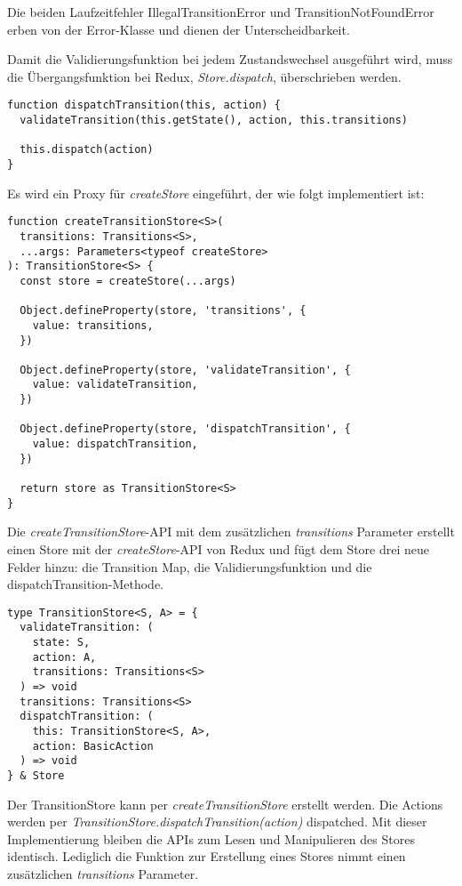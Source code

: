 Die beiden Laufzeitfehler IllegalTransitionError und TransitionNotFoundError erben von der Error-Klasse und dienen der Unterscheidbarkeit.

Damit die Validierungsfunktion bei jedem Zustandswechsel ausgeführt wird, muss die Übergangsfunktion bei Redux, \textit{Store.dispatch}, überschrieben werden.

\begin{lstlisting}
function dispatchTransition(this, action) {
  validateTransition(this.getState(), action, this.transitions)
  
  this.dispatch(action)
}
\end{lstlisting}

Es wird ein Proxy für \textit{createStore} eingeführt, der wie folgt implementiert ist:

\begin{lstlisting}
function createTransitionStore<S>(
  transitions: Transitions<S>,
  ...args: Parameters<typeof createStore>
): TransitionStore<S> {
  const store = createStore(...args)
  
  Object.defineProperty(store, 'transitions', {
    value: transitions,
  })
  
  Object.defineProperty(store, 'validateTransition', {
    value: validateTransition,
  })
  
  Object.defineProperty(store, 'dispatchTransition', {
    value: dispatchTransition,
  })
  
  return store as TransitionStore<S>
}
\end{lstlisting}

Die \textit{createTransitionStore}-API mit dem zusätzlichen \textit{transitions} Parameter erstellt einen Store mit der \textit{createStore}-API von Redux und fügt dem Store drei neue Felder hinzu: die Transition Map, die Validierungsfunktion und die dispatchTransition-Methode.

\begin{lstlisting}
type TransitionStore<S, A> = {
  validateTransition: (
    state: S,
    action: A,
    transitions: Transitions<S>
  ) => void
  transitions: Transitions<S>
  dispatchTransition: (
    this: TransitionStore<S, A>,
    action: BasicAction
  ) => void
} & Store  
\end{lstlisting}

Der TransitionStore kann per \textit{createTransitionStore} erstellt werden. Die Actions werden per \textit{TransitionStore.dispatchTransition(action)} dispatched. Mit dieser Implementierung bleiben die APIs zum Lesen und Manipulieren des Stores identisch. Lediglich die Funktion zur Erstellung eines Stores nimmt einen zusätzlichen \textit{transitions} Parameter.

